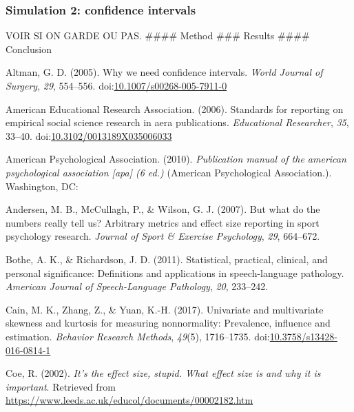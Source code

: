 \documentclass[
  man,floatsintext]{apa6}
\begin{document}
\hypertarget{simulation-2-confidence-intervals}{%
\subsubsection{Simulation 2: confidence intervals}\label{simulation-2-confidence-intervals}}

VOIR SI ON GARDE OU PAS.
\#\#\#\# Method
\#\#\# Results
\#\#\#\# Conclusion

\hypertarget{refs}{}
\leavevmode\hypertarget{ref-Altman_2005}{}%
Altman, G. D. (2005). Why we need confidence intervals. \emph{World Journal of Surgery}, \emph{29}, 554--556. doi:\href{https://doi.org/10.1007/s00268-005-7911-0}{10.1007/s00268-005-7911-0}

\leavevmode\hypertarget{ref-AERA_2006}{}%
American Educational Research Association. (2006). Standards for reporting on empirical social science research in aera publications. \emph{Educational Researcher}, \emph{35}, 33--40. doi:\href{https://doi.org/10.3102/0013189X035006033}{10.3102/0013189X035006033}

\leavevmode\hypertarget{ref-APA_2010}{}%
American Psychological Association. (2010). \emph{Publication manual of the american psychological association {[}apa{]} (6 ed.)} (American Psychological Association.). Washington, DC:

\leavevmode\hypertarget{ref-Andersen_et_al_2007}{}%
Andersen, M. B., McCullagh, P., \& Wilson, G. J. (2007). But what do the numbers really tell us? Arbitrary metrics and effect size reporting in sport psychology research. \emph{Journal of Sport \& Exercise Psychology}, \emph{29}, 664--672.

\leavevmode\hypertarget{ref-Bothe_Richardson_2011}{}%
Bothe, A. K., \& Richardson, J. D. (2011). Statistical, practical, clinical, and personal significance: Definitions and applications in speech-language pathology. \emph{American Journal of Speech-Language Pathology}, \emph{20}, 233--242.

\leavevmode\hypertarget{ref-Cain_et_al_2017}{}%
Cain, M. K., Zhang, Z., \& Yuan, K.-H. (2017). Univariate and multivariate skewness and kurtosis for measuring nonnormality: Prevalence, influence and estimation. \emph{Behavior Research Methods}, \emph{49}(5), 1716--1735. doi:\href{https://doi.org/10.3758/s13428-016-0814-1}{10.3758/s13428-016-0814-1}

\leavevmode\hypertarget{ref-Coe_2002}{}%
Coe, R. (2002). \emph{It's the effect size, stupid. What effect size is and why it is important}. Retrieved from \url{https://www.leeds.ac.uk/educol/documents/00002182.htm}
\end{document}
